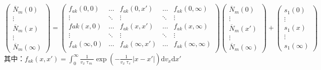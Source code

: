 \documentclass{article}
\begin{document}
	\begin{equation}\label{eq:8}
		\begin{pmatrix}
			\overline{N}_m(0)\\ \vdots\\ \overline{N}_m(x)\\ \vdots \\ \overline{N}_m(\infty)
		\end{pmatrix}
		=
		\begin{pmatrix}
			f_{ak}(0,0)&\dots&f_{ak}(0,x')&\dots&f_{ak}(0,\infty)\\
			\vdots&\ddots&\vdots&\ddots&\vdots\\
			f{ak}(x,0)&\dots&f_{ak}(x,x')&\dots&f_{ak}(x,\infty)\\
			\vdots&\ddots&\vdots&\ddots&\vdots\\
			f_{ak}(\infty,0)&\dots&f_{ak}(\infty,x')&\dots&f_{ak}(\infty,\infty)\\
		\end{pmatrix}
		\begin{pmatrix}
			\overline{N}_m(0)\\ \vdots\\ \overline{N}_m(x')\\ \vdots \\ \overline{N}_m(\infty)
		\end{pmatrix}
		+
		\begin{pmatrix}
			s_1(0)\\ \vdots\\s_1(x)\\ \vdots\\s_1(\infty)
		\end{pmatrix}
	\end{equation}
	其中：$f_{ak}(x,x')=\displaystyle\int_0^{\infty}\frac{1}{v_x\uptau_m}\exp(-\frac{1}{v_x\uptau_c}|x-x'|)\mathrm{d}v_x\mathrm{d}x'$
\end{document}
